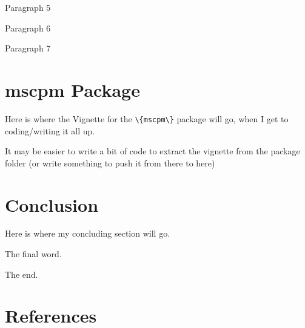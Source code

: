\documentclass[12pt,twoside]{reedthesis}
\begin{document}
Paragraph 5

Paragraph 6

Paragraph 7

\hypertarget{chap-mscpm}{%
\chapter{mscpm Package}\label{chap-mscpm}}

Here is where the Vignette for the \texttt{\textbackslash{}\{mscpm\textbackslash{}\}} package will go, when I get to coding/writing it all up.

It may be easier to write a bit of code to extract the vignette from the package folder (or write something to push it from there to here)

\hypertarget{chap-conclusion}{%
\chapter{Conclusion}\label{chap-conclusion}}

Here is where my concluding section will go.

The final word.

The end.

\backmatter

\hypertarget{references}{%
\chapter*{References}\label{references}}


\noindent

\setlength{\parindent}{-0.20in}
\setlength{\leftskip}{0.20in}
\setlength{\parskip}{8pt}
\end{document}
